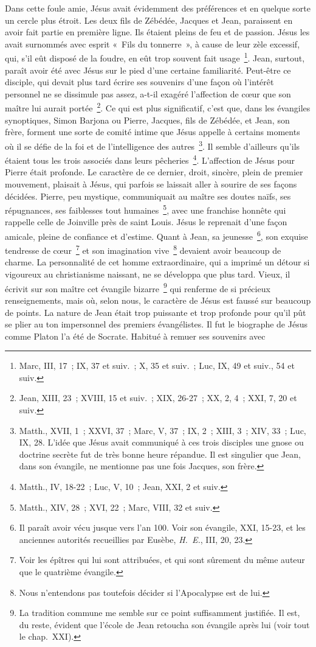 \documentclass[french,twoside]{book} %
\begin{document}
Dans cette foule amie, Jésus avait évidemment des préférences et en quelque sorte un cercle plus étroit. Les deux fils de Zébédée, Jacques et Jean, paraissent en avoir fait partie en première ligne. Ils étaient pleins de feu et de passion. Jésus les avait surnommés avec esprit « Fils du tonnerre », à cause de leur zèle excessif, qui, s’il eût disposé de la foudre, en eût trop souvent fait usage \footnote{Marc, III, 17 ; IX, 37 et suiv. ; X, 35 et suiv. ; Luc, IX, 49 et suiv., 54 et suiv.}. Jean, surtout, paraît avoir été avec Jésus sur le pied d’une certaine familiarité. Peut-être ce disciple, qui devait plus tard écrire ses souvenirs d’une façon où l’intérêt personnel ne se dissimule pas assez, a-t-il exagéré l’affection de cœur que son maître lui aurait portée \footnote{Jean, XIII, 23 ; XVIII, 15 et suiv. ; XIX, 26-27 ; XX, 2, 4 ; XXI, 7, 20 et suiv.}. Ce qui est plus significatif, c’est que, dans les évangiles synoptiques, Simon Barjona ou Pierre, Jacques, fils de Zébédée, et Jean, son frère, forment une sorte de comité intime que Jésus appelle à certains moments où il se défie de la foi et de l’intelligence des autres \footnote{ Matth., XVII, 1 ; XXVI, 37 ; Marc, V, 37 ; IX, 2 ; XIII, 3 ; XIV, 33 ; Luc, IX, 28. L’idée que Jésus avait communiqué à ces trois disciples une gnose ou doctrine secrète fut de très bonne heure répandue. Il est singulier que Jean, dans son évangile, ne mentionne pas une fois Jacques, son frère.}. Il semble d’ailleurs qu’ils étaient tous les trois associés dans leurs pêcheries \footnote{Matth., IV, 18-22 ; Luc, V, 10 ; Jean, XXI, 2 et suiv.}. L’affection de Jésus pour Pierre était profonde. Le caractère de ce dernier, droit, sincère, plein de premier mouvement, plaisait à Jésus, qui parfois se laissait aller à sourire de ses façons décidées. Pierre, peu mystique, communiquait au maître ses doutes naïfs, ses répugnances, ses faiblesses tout humaines \footnote{Matth., XIV, 28 ; XVI, 22 ; Marc, VIII, 32 et suiv.}, avec une franchise honnête qui rappelle celle de Joinville près de saint Louis. Jésus le reprenait d’une façon amicale, pleine de confiance et d’estime. Quant à Jean, sa jeunesse \footnote{ Il paraît avoir vécu jusque vers l’an 100. Voir son évangile, XXI, 15-23, et les anciennes autorités recueillies par Eusèbe, {\itshape H. E.}, III, 20, 23.}, son exquise tendresse de cœur \footnote{Voir les épîtres qui lui sont attribuées, et qui sont sûrement du même auteur que le quatrième évangile.} et son imagination vive \footnote{Nous n’entendons pas toutefois décider si l’Apocalypse est de lui.} devaient avoir beaucoup de charme. La personnalité de cet homme extraordinaire, qui a imprimé un détour si vigoureux au christianisme naissant, ne se développa que plus tard. Vieux, il écrivit sur son maître cet évangile bizarre \footnote{ La tradition commune me semble sur ce point suffisamment justifiée. Il est, du reste, évident que l’école de Jean retoucha son évangile après lui (voir tout le chap. XXI).} qui renferme de si précieux renseignements, mais où, selon nous, le caractère de Jésus est faussé sur beaucoup de points. La nature de Jean était trop puissante et trop profonde pour qu’il pût se plier au ton impersonnel des premiers évangélistes. Il fut le biographe de Jésus comme Platon l’a été de Socrate. Habitué à remuer ses souvenirs avec 
\end{document}
